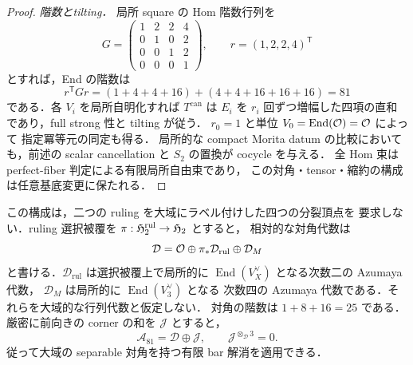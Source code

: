 \begin{proof}
\emph{階数とtilting．}
局所 square の Hom 階数行列を
\[
 G=\begin{pmatrix}1&2&2&4\\0&1&0&2\\0&0&1&2\\0&0&0&1\end{pmatrix},
 \qquad r=(1,2,2,4)^{\mathsf T}
\]
とすれば，End の階数は
\[
 r^{\mathsf T}Gr
 =(1+4+4+16)+(4+4+16+16+16)=81
\]
である．各 $V_i$ を局所自明化すれば $T^{\mathrm{can}}$ は $E_i$ を
$r_i$ 回ずつ増幅した四項の直和であり，full strong 性と tilting が従う．
$r_0=1$ と単位 $V_0=\operatorname{End}(\mathcal O)=\mathcal O$ によって
指定冪等元の同定も得る．
局所的な compact Morita datum の比較においても，前述の scalar cancellation
と $S_2$ の置換が cocycle を与える．
全 Hom 束は perfect-fiber 判定による有限局所自由束であり，
この対角・tensor・縮約の構成は任意基底変更に保たれる．
\end{proof}

\begin{remark}[大域の対角代数]
\label{rem:qa-h2-rank81-diagonal}
この構成は，二つの ruling を大域にラベル付けした四つの分裂頂点を
要求しない．ruling 選択被覆を $\pi:\mathfrak H_2^{\mathrm{rul}}\to\mathfrak H_2$ とすると，
相対的な対角代数は
\[
 \mathcal D=\mathcal O\oplus\pi_*\mathcal D_{\mathrm{rul}}\oplus\mathcal D_M
\]
と書ける．$\mathcal D_{\mathrm{rul}}$ は選択被覆上で局所的に
$\operatorname{End}(V_X^\vee)$ となる次数二の Azumaya 代数，
$\mathcal D_M$ は局所的に $\operatorname{End}(V_3^\vee)$ となる
次数四の Azumaya 代数である．それらを大域的な行列代数と仮定しない．
対角の階数は $1+8+16=25$ である．
厳密に前向きの corner の和を $\mathcal J$ とすると，
\[
 \mathcal A_{81}=\mathcal D\oplus\mathcal J,
 \qquad \mathcal J^{\otimes_{\mathcal D}3}=0.
\]
従って大域の separable 対角を持つ有限 bar 解消を適用できる．
\end{remark}

